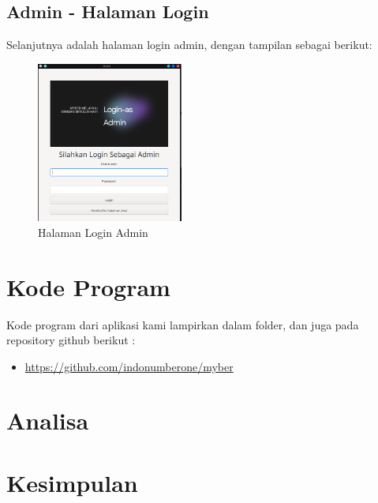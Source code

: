 \documentclass[a4paper,12pt]{article}
\begin{document}
\subsection{Admin - Halaman Login}
Selanjutnya adalah halaman login admin, dengan tampilan sebagai berikut:
\begin{figure}[!htbp]
    \centering
    \includegraphics[width=0.43\textwidth]{./Login_admin.png}
    \caption{Halaman Login Admin}

\end{figure}
\FloatBarrier 

\section{Kode Program}
Kode program dari aplikasi kami lampirkan dalam folder, dan juga pada repository github berikut :
\begin{itemize}
    \item \url{https://github.com/indonumberone/myber}
\end{itemize}

\section{Analisa}


\section{Kesimpulan}
\end{document}

